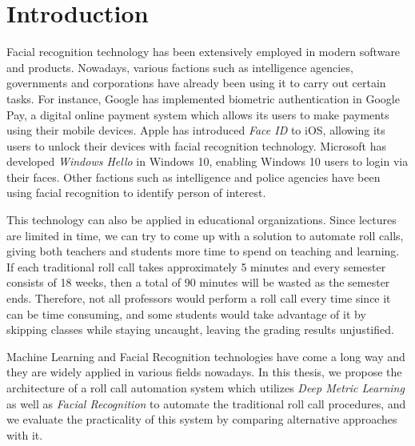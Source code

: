 \chapter{Introduction}
Facial recognition technology has been extensively employed in modern software and products. Nowadays, various factions
such as intelligence agencies, governments and corporations have already been using it to carry out certain tasks.
For instance, Google has implemented biometric authentication in Google Pay, a digital online payment system
which allows its users to make payments using their mobile devices. Apple has introduced \emph{Face ID} to iOS, allowing its users
to unlock their devices with facial recognition technology. Microsoft has developed \emph{Windows Hello} in Windows 10, enabling
Windows 10 users to login via their faces. Other factions such as intelligence and police agencies have been using facial recognition
to identify person of interest.

This technology can also be applied in educational organizations. Since lectures are limited in time, we can try to come up
with a solution to automate roll calls, giving both teachers and students more time to spend on teaching and learning.
If each traditional roll call takes approximately 5 minutes and every semester consists of 18 weeks, then a total of 90 minutes
will be wasted as the semester ends. Therefore, not all professors would perform a roll call every time since it can be time consuming,
and some students would take advantage of it by skipping classes while staying uncaught, leaving the grading results unjustified.

Machine Learning and Facial Recognition technologies have come a long way and they are widely applied in various fields nowadays.
In this thesis, we propose the architecture of a roll call automation system which utilizes \emph{Deep Metric Learning} as well as
\emph{Facial Recognition} to automate the traditional roll call procedures, and we evaluate the practicality of this system 
by comparing alternative approaches with it.




